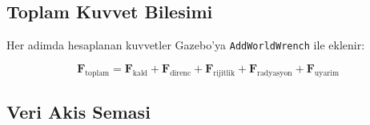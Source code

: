 \documentclass[12pt,a4paper]{article}
\newcommand{\Fvec}{\mathbf{F}}
\begin{document}
\subsection{Toplam Kuvvet Bilesimi}

Her adimda hesaplanan kuvvetler Gazebo'ya \texttt{AddWorldWrench} ile eklenir:

\begin{equation}
  \boxed{
  \Fvec_{\text{toplam}}
    = \Fvec_{\text{kald}}
    + \Fvec_{\text{direnc}}
    + \Fvec_{\text{rijitlik}}
    + \Fvec_{\text{radyasyon}}
    + \Fvec_{\text{uyarim}}
  }
  \label{eq:force_sum}
\end{equation}

\subsection{Veri Akis Semasi}
\end{document}
